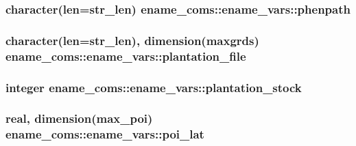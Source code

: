 \subsubsection[{\texorpdfstring{phenpath}{phenpath}}]{\setlength{\rightskip}{0pt plus 5cm}character(len=str\+\_\+len) ename\+\_\+coms\+::ename\+\_\+vars\+::phenpath}\hypertarget{structename__coms_1_1ename__vars_a3cd7a9b820dac3238181ea9791a817c7}{}\label{structename__coms_1_1ename__vars_a3cd7a9b820dac3238181ea9791a817c7}
\subsubsection[{\texorpdfstring{plantation\+\_\+file}{plantation_file}}]{\setlength{\rightskip}{0pt plus 5cm}character(len=str\+\_\+len), dimension(maxgrds) ename\+\_\+coms\+::ename\+\_\+vars\+::plantation\+\_\+file}\hypertarget{structename__coms_1_1ename__vars_a466aacc58395db708dab81248d637b31}{}\label{structename__coms_1_1ename__vars_a466aacc58395db708dab81248d637b31}
\subsubsection[{\texorpdfstring{plantation\+\_\+stock}{plantation_stock}}]{\setlength{\rightskip}{0pt plus 5cm}integer ename\+\_\+coms\+::ename\+\_\+vars\+::plantation\+\_\+stock}\hypertarget{structename__coms_1_1ename__vars_a3722272c39c92fba801c8c80d4edf1ad}{}\label{structename__coms_1_1ename__vars_a3722272c39c92fba801c8c80d4edf1ad}
\subsubsection[{\texorpdfstring{poi\+\_\+lat}{poi_lat}}]{\setlength{\rightskip}{0pt plus 5cm}real, dimension(max\+\_\+poi) ename\+\_\+coms\+::ename\+\_\+vars\+::poi\+\_\+lat}\hypertarget{structename__coms_1_1ename__vars_a1a12085b47e9531b651a936ffbb812a2}{}\label{structename__coms_1_1ename__vars_a1a12085b47e9531b651a936ffbb812a2}
